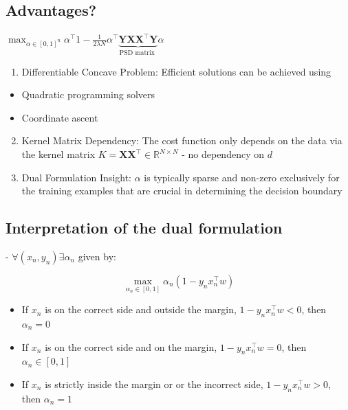 \subsection*{Advantages?}
$
\max _{\alpha \in[0,1]^{n}} \alpha^{\top} 1-\frac{1}{2 \lambda N} \alpha^{\top} \underbrace{\mathbf{Y X} \mathbf{X}^{\top} \mathbf{Y}}_{\text {PSD matrix }} \alpha
$

\begin{enumerate}
  \item Differentiable Concave Problem: Efficient solutions can be achieved using
\end{enumerate}

\begin{itemize}
  \item Quadratic programming solvers
  \item Coordinate ascent
\end{itemize}

\begin{enumerate}
  \setcounter{enumi}{1}
  \item Kernel Matrix Dependency: The cost function only depends on the data via the kernel matrix $K=\mathbf{X} \mathbf{X}^{\top} \in \mathbb{R}^{N \times N}$ - no dependency on $d$

  \item Dual Formulation Insight: $\alpha$ is typically sparse and non-zero exclusively for the training examples that are crucial in determining the decision boundary

\end{enumerate}

\subsection*{Interpretation of the dual formulation}
- $\forall \left(x_{n}, y_{n}\right) \exists \alpha_{n}$ given by:

\vspace{-10pt}
$$
\max _{\alpha_{n} \in[0,1]} \alpha_{n}\left(1-y_{n} x_{n}^{\top} w\right)
$$


\begin{itemize}
  \item If $x_{n}$ is on the correct side and outside the margin, $1-y_{n} x_{n}^{\top} w<0$, then $\alpha_{n}=0$
  \item If $x_{n}$ is on the correct side and on the margin, $1-y_{n} x_{n}^{\top} w=0$, then $\alpha_{n} \in[0,1]$
  \item If $x_{n}$ is strictly inside the margin or or the incorrect side, $1-y_{n} x_{n}^{\top} w>0$, then $\alpha_{n}=1$
\end{itemize}

